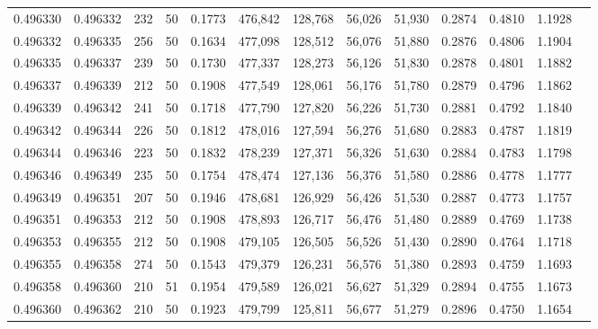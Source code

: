 \begin{tabular}{rrrrrrrrrrrrr}
0.496330 & 0.496332 &   232 &  50 &                                     0.1773 & 476,842 & 128,768 &  56,026 &  51,930 & 0.2874 & 0.4810 & 1.1928 \\
0.496332 & 0.496335 &   256 &  50 &                                     0.1634 & 477,098 & 128,512 &  56,076 &  51,880 & 0.2876 & 0.4806 & 1.1904 \\
0.496335 & 0.496337 &   239 &  50 &                                     0.1730 & 477,337 & 128,273 &  56,126 &  51,830 & 0.2878 & 0.4801 & 1.1882 \\
0.496337 & 0.496339 &   212 &  50 &                                     0.1908 & 477,549 & 128,061 &  56,176 &  51,780 & 0.2879 & 0.4796 & 1.1862 \\
0.496339 & 0.496342 &   241 &  50 &                                     0.1718 & 477,790 & 127,820 &  56,226 &  51,730 & 0.2881 & 0.4792 & 1.1840 \\
0.496342 & 0.496344 &   226 &  50 &                                     0.1812 & 478,016 & 127,594 &  56,276 &  51,680 & 0.2883 & 0.4787 & 1.1819 \\
0.496344 & 0.496346 &   223 &  50 &                                     0.1832 & 478,239 & 127,371 &  56,326 &  51,630 & 0.2884 & 0.4783 & 1.1798 \\
0.496346 & 0.496349 &   235 &  50 &                                     0.1754 & 478,474 & 127,136 &  56,376 &  51,580 & 0.2886 & 0.4778 & 1.1777 \\
0.496349 & 0.496351 &   207 &  50 &                                     0.1946 & 478,681 & 126,929 &  56,426 &  51,530 & 0.2887 & 0.4773 & 1.1757 \\
0.496351 & 0.496353 &   212 &  50 &                                     0.1908 & 478,893 & 126,717 &  56,476 &  51,480 & 0.2889 & 0.4769 & 1.1738 \\
0.496353 & 0.496355 &   212 &  50 &                                     0.1908 & 479,105 & 126,505 &  56,526 &  51,430 & 0.2890 & 0.4764 & 1.1718 \\
0.496355 & 0.496358 &   274 &  50 &                                     0.1543 & 479,379 & 126,231 &  56,576 &  51,380 & 0.2893 & 0.4759 & 1.1693 \\
0.496358 & 0.496360 &   210 &  51 &                                     0.1954 & 479,589 & 126,021 &  56,627 &  51,329 & 0.2894 & 0.4755 & 1.1673 \\
0.496360 & 0.496362 &   210 &  50 &                                     0.1923 & 479,799 & 125,811 &  56,677 &  51,279 & 0.2896 & 0.4750 & 1.1654 \\

\end{tabular}
